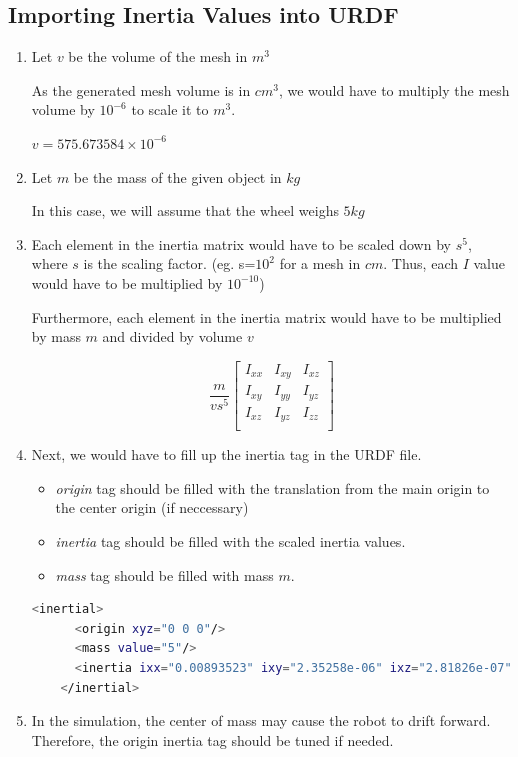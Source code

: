 \documentclass[11pt]{article}
\begin{document}
\subsection{Importing Inertia Values into URDF}
\begin{enumerate}
 \item {
       Let $v$ be the volume of the mesh in $m^3$
       
       As the generated mesh volume is in ${cm}^3$, we would have to multiply the mesh volume by $10^{-6}$ to scale it to $m^3$.
       
       $v=575.673584\times10^{-6}$
       }
 \item {
       Let $m$ be the mass of the given object in $kg$
       
       In this case, we will assume that the wheel weighs $5kg$
       }
 \item {
       
       Each element in the inertia matrix would have to be scaled down by $s^5$, where $s$ is the scaling factor.
       (eg. s=$10^2$ for a mesh in $cm$. Thus, each $I$ value would have to be multiplied by $10^{-10}$)
       
       Furthermore, each element in the inertia matrix would have to be multiplied by mass $m$ and divided by volume $v$
       
       $$
        \frac{m}{vs^5}
        \begin{bmatrix}
         I_{xx} & I_{xy} & I_{xz} \\
         I_{xy} & I_{yy} & I_{yz} \\
         I_{xz} & I_{yz} & I_{zz} \\
        \end{bmatrix}
       $$
       }
 \item{
       Next, we would have to fill up the inertia tag in the URDF file.
       \begin{itemize}
        \item { \emph{origin} tag should be filled with the translation from the main origin to the center origin (if neccessary)}
        \item { \emph{inertia} tag should be filled with the scaled inertia values. }
        \item { \emph{mass} tag should be filled with mass $m$.}
       \end{itemize}
       \begin{lstlisting}[language=bash]
    <inertial>
      <origin xyz="0 0 0"/>
      <mass value="5"/>
      <inertia ixx="0.00893523" ixy="2.35258e-06" ixz="2.81826e-07" iyy="0.00586446" iyz="-3.54454e-07" izz="0.00586635"/>
    </inertial>
       \end{lstlisting}
       }
 \item {
       In the simulation, the center of mass may cause the robot to drift forward. Therefore, the origin inertia tag should be tuned if needed.
       }
\end{enumerate}
\end{document}
